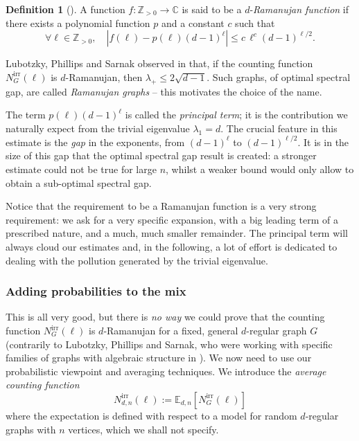 \documentclass[12pt,twoside]{article}
\theoremstyle{theorem}
\theoremstyle{remark}
\theoremstyle{definition}
\newtheorem{defi}[thm]{Definition}
\theoremstyle{example}
\newcommand{\C}{\mathbb{C}}
\newcommand{\Z}{\mathbb{Z}}
\newcommand{\1}[1]{\mathds{1}_{#1}}
\begin{document}
\begin{defi}[{\cite{friedman2003}}]
  A function $f : \Z_{>0} \rightarrow \C$ is said to be a $d$-\emph{Ramanujan function} if there exists
  a polynomial function $p$ and a constant $c$ such that
  \begin{equation*}
    \forall \ell \in \Z_{>0}, \quad
    |f(\ell) - p(\ell) (d-1)^\ell| \leq c \, \ell^c (d-1)^{\ell/2}.
  \end{equation*}
\end{defi}

Lubotzky, Phillips and Sarnak observed in \cite{lubotzky1988} that, if the counting function
$N_G^{\mathrm{irr}}(\ell)$ is $d$-Ramanujan, then $\lambda_+ \leq 2 \sqrt{d-1}$. Such graphs, of
optimal spectral gap, are called \emph{Ramanujan graphs} -- this motivates the choice of the name.

The term $p(\ell) (d-1)^\ell$ is called the \emph{principal term}; it is the contribution we
naturally expect from the trivial eigenvalue $\lambda_1=d$. The crucial feature in this estimate is
the \emph{gap} in the exponents, from $(d-1)^\ell$ to $(d-1)^{\ell/2}$. It is in the size of this
gap that the optimal spectral gap result is created: a stronger estimate could not be true for large
$n$, whilst a weaker bound would only allow to obtain a sub-optimal spectral gap.

Notice that the requirement to be a Ramanujan function is a very strong requirement: we ask for a
very specific expansion, with a big leading term of a prescribed nature, and a much, much smaller
remainder. The principal term will always cloud our estimates and, in the following, a lot of
 effort is dedicated to dealing with the pollution generated by the trivial eigenvalue.

\subsubsection{Adding probabilities to the mix}
\label{sec:prob-trace-meth}

This is all very good, but there is \emph{no way} we could prove that the counting function
$N_G^{\mathrm{irr}}(\ell)$ is $d$-Ramanujan for a fixed, general $d$-regular graph $G$ (contrarily
to Lubotzky, Phillips and Sarnak, who were working with specific families of graphs with algebraic
structure in \cite{lubotzky1988}). We now need to use our probabilistic viewpoint and averaging
techniques. We introduce the \emph{average counting function}
\begin{equation*}
  N_{d,n}^{\mathrm{irr}}(\ell) := \mathbb{E}_{d,n}[N^{\mathrm{irr}}_G(\ell)]
\end{equation*}
where the expectation is defined with respect to a model for random $d$-regular graphs with $n$
vertices, which we shall not specify.
\end{document}

